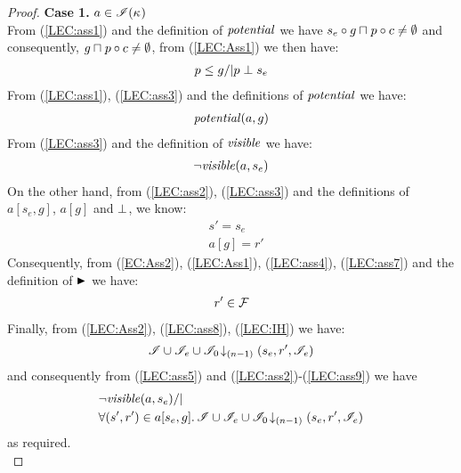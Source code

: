 \begin{lemma}
\begin{proof}
\noindent\textbf{Case 1. } $a \in \mathscr{I}(\kappa_{})$\\ 
From (\ref{LEC:ass1}) and the definition of $\mathit{potential}$ we have $s_e \circ g \sqcap_{} p \circ c \not= \emptyset$ and consequently, $g \sqcap_{} p \circ c \not= \emptyset$, from (\ref{LEC:Ass1}) we then have:
%
\begin{align}
	p \leq g /| p \mathrel{\bot} s_e \label{LEC:ass3}
\end{align}
% 
From (\ref{LEC:ass1}), (\ref{LEC:ass3}) and the definitions of $\mathit{potential}$ we have:
%
\begin{align}
	\mathit{potential}(a, g) \label{LEC:ass4}
\end{align}
%
From (\ref{LEC:ass3}) and the definition of $\mathit{visible}$ we have:
%
\begin{align}
	\neg\mathit{visible}(a, s_e) 
	\label{LEC:ass5}
\end{align}
%
On the other hand, from (\ref{LEC:ass2}), (\ref{LEC:ass3}) and the definitions of $a[s_e, g]$, $a[g]$ and $\mathrel{\bot}$, we know: 
%
\begin{align}
	& s' = s_e  \label{LEC:ass6}\\
	& a[g] = r'  \label{LEC:ass7}
\end{align}
%
Consequently, from (\ref{EC:Ass2}), (\ref{LEC:Ass1}), (\ref{LEC:ass4}),  (\ref{LEC:ass7}) and the definition of $\strictfences$ we have:
%
\begin{align}
	r' \in \mathcal{F}_{}  \label{LEC:ass8}
\end{align}
%
Finally, from (\ref{LEC:Ass2}), (\ref{LEC:ass8}), (\ref{LEC:IH}) we have:
%
\begin{align}
	\mathscr{I} \cup \mathscr{I}_{e} \cup \mathscr{I}_0 \!\downarrow_{(n-1)} \left(s_e, r', \mathscr{I}_e\right)
	\label{LEC:ass9}
\end{align}
%
and consequently from (\ref{LEC:ass5}) and (\ref{LEC:ass2})-(\ref{LEC:ass9}) we have
%
\begin{align*}
	& \neg\mathit{visible}(a, s_e) /| \\
	& \forall (s', r') \in a[s_e, g].\, \mathscr{I} \cup \mathscr{I}_{e} \cup \mathscr{I}_0 \!\downarrow_{(n-1)} \left(s_e, r', \mathscr{I}_e\right)
\end{align*}
%
as required.\\
%
%
%
%


\end{proof}
\end{lemma}
